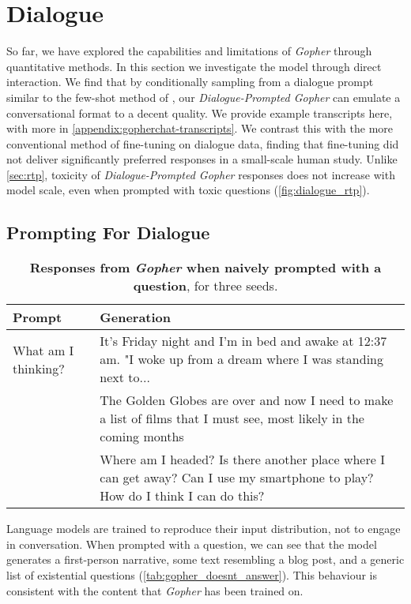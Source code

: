 \documentclass[11pt, a4paper, logo, internal, copyright, nonumbering]{deepmind}
\newcommand{\gopher}{\textit{Gopher}\xspace}
\newcommand{\gopherchat}{\textit{Dialogue-Prompted Gopher}\xspace}
\begin{document}
\section{Dialogue}
\label{sec:dialogue}
So far, we have explored the capabilities and limitations of \gopher through quantitative methods. In this section we investigate the model through direct interaction. We find that by conditionally sampling from a dialogue prompt similar to the few-shot method of \citet{gpt3}, our \gopherchat can emulate a conversational format to a decent quality. We provide example transcripts here, with more in \autoref{appendix:gopherchat-transcripts}. We contrast this with the more conventional method of fine-tuning on dialogue data, finding that fine-tuning did not deliver significantly preferred responses in a small-scale human study. Unlike \autoref{sec:rtp}, toxicity of \gopherchat  responses does not increase with model scale, even when prompted with toxic questions (\autoref{fig:dialogue_rtp}).

\subsection{Prompting For Dialogue}

\begin{table}[h]
    \centering
    \begin{tabular}{p{}p{}}
    \hline
    \textbf{Prompt} & \textbf{Generation}  \\
    \hline
    {\small What am I thinking?} & {\small It's Friday night and I'm in bed and awake at 12:37 am. "I woke up from a dream where I was standing next to... } \\
    \hline
    & {\small  The Golden Globes are over and now I need to make a list of films that I must see, most likely in the coming months} \\
    \hline
    & {\small Where am I headed? Is there another place where I can get away? Can I use my smartphone to play? How do I think I can do this?} \\ 
    \hline
    \end{tabular}
    \caption{\textbf{Responses from \gopher when naively prompted with a question}, for three seeds.}
    \label{tab:gopher_doesnt_answer}
\end{table}

Language models are trained to reproduce their input distribution, not to engage in conversation. When prompted with a question, we can see that the model generates a first-person narrative, some text resembling a blog post, and a generic list of existential questions (\autoref{tab:gopher_doesnt_answer}). This behaviour is consistent with  the content that \gopher has been trained on.  
\end{document}
